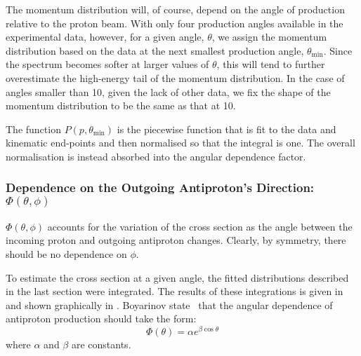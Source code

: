 The momentum distribution will, of course, depend on the angle of production relative to the proton beam.
With only four production angles available in the experimental data, however, for a given angle, $\theta$, we assign the momentum distribution based on the data at the next smallest production angle, $\theta_\textrm{min}$.
Since the spectrum becomes softer at larger values of $\theta$, this will tend to further overestimate the high-energy tail of the momentum distribution.
In the case of angles smaller than 10\degree, given the lack of other data, we fix the  shape of the momentum distribution to be the same as that at 10\degree.

The function $P(p,\theta_\textrm{min})$ is the piecewise function that is fit to the data and kinematic end-points and then normalised so that the integral is one.
The overall normalisation is instead absorbed into the angular dependence factor.

\subsubsection*{Dependence on the Outgoing Antiproton's Direction: $\Phi(\theta,\phi)$}
\TabAntiprotonRegions
\FigAntiprotonAngularDependence
$\Phi(\theta,\phi)$ accounts for the variation of the cross section as the angle between the incoming proton and outgoing antiproton changes.
Clearly, by symmetry, there should be no dependence on $\phi$.

To estimate the cross section at a given angle, the fitted distributions described in the last section were integrated.
The results of these integrations is given in  and shown graphically in .
Boyarinov \etal state~\cite{Boyarinov:1994tp} that the angular dependence of antiproton production should take the form:
\begin{equation}
\Phi(\theta)=\alpha e^{\beta\cos\theta}
\end{equation}
where $\alpha$ and $\beta$ are constants. 

